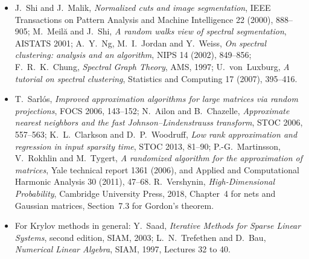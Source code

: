 \begin{itemize}
\emph{Nearly-linear time algorithms for graph partitioning, graph sparsification, and solving linear systems}, STOC 2004, 81--90.
\item J.~Shi and J.~Malik, \emph{Normalized cuts and image segmentation}, IEEE Transactions on Pattern Analysis and Machine Intelligence 22 (2000), 888--905; M.~Meil\u{a} and J.~Shi, \emph{A random walks
view of spectral segmentation}, AISTATS 2001; A.~Y.~Ng, M.~I.~Jordan and Y.~Weiss, \emph{On spectral clustering: analysis and an algorithm}, NIPS 14 (2002), 849--856; F.~R.~K.~Chung, \emph{Spectral Graph
Theory}, AMS, 1997; U.~von~Luxburg, \emph{A tutorial on spectral clustering}, Statistics and Computing 17 (2007), 395--416.
\item T.~Sarl\'os, \emph{Improved approximation algorithms for large matrices via random projections}, FOCS 2006, 143--152; N.~Ailon and B.~Chazelle, \emph{Approximate nearest neighbors and the fast
Johnson--Lindenstrauss transform}, STOC 2006, 557--563; K.~L.~Clarkson and D.~P.~Woodruff, \emph{Low rank approximation and regression in input sparsity time}, STOC 2013, 81--90; P.-G.~Martinsson,
V.~Rokhlin and M.~Tygert, \emph{A randomized algorithm for the approximation of matrices}, Yale technical report 1361 (2006), and Applied and Computational Harmonic Analysis 30 (2011), 47--68.
R.~Vershynin, \emph{High-Dimensional Probability}, Cambridge University Press, 2018, Chapter~4 for nets and Gaussian matrices, Section~7.3 for Gordon's theorem.
\item For Krylov methods in general: Y.~Saad, \emph{Iterative Methods for Sparse Linear Systems}, second edition, SIAM, 2003; L.~N.~Trefethen and D.~Bau, \emph{Numerical Linear Algebra}, SIAM, 1997, Lectures 32 to 40.
\end{itemize}
